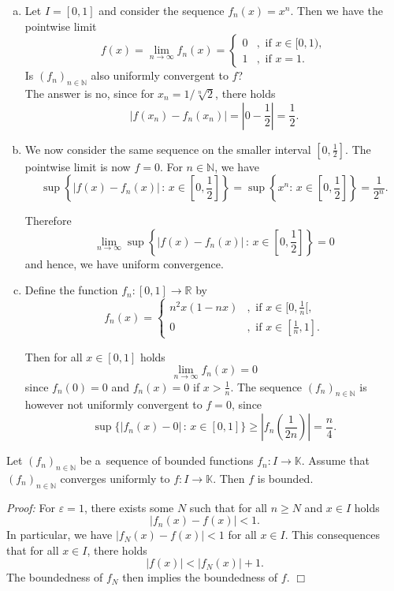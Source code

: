 \begin{example}\label{ex:funcconv}
 \begin{enumerate}[a)]
\item Let $I=[0,1]$ and consider the sequence $f_n(x)= x^n$. Then we have the pointwise limit
\[f(x)=\lim_{n\to\infty}f_n(x)=\begin{cases}0&,\text{ if }x\in[0,1),\\1&,\text{ if }x=1.\end{cases}\]
Is $(f_n)_{n\in\mathbb{N}}$ also uniformly convergent to $f$?\\

The answer is no, since for $x_n=1/\sqrt[n]{2}$, there holds
\[|f(x_n)-f_n(x_n)|=\left|0-{\textstyle\frac12}\right|={\textstyle\frac12}.\]

\item We now consider the same sequence on the smaller interval $[0,\frac12]$. The pointwise limit is now $f=0$. For $n\in\mathbb{N}$, we have
\[\sup\left\{|f(x)-f_n(x)|\,:\,x\in[0,{\textstyle\frac12}]\right\}=\sup\left\{x^{n}:\,x\in[0,{\textstyle\frac12}]\right\}=\frac1{2^n}.\]

Therefore
\[\lim_{n\to\infty}\sup\left\{|f(x)-f_n(x)|\,:\,x\in[0,{\textstyle\frac12}]\right\}=0\]
and hence, we have uniform convergence.

\item Define the function $f_n:[0,1]\to\mathbb{R}$ by
\[f_n(x)=\begin{cases}n^2x(1-nx)&,\text{ if }x\in[0,\frac1n[,\\0&,\text{ if }x\in[\frac1n,1].\end{cases}\]

Then for all $x\in[0,1]$ holds
\[\lim_{n\to\infty}f_n(x)=0\]
since $f_n(0)=0$ and $f_n(x)=0$ if $x>\frac1n$. The sequence $(f_n)_{n\in\mathbb{N}}$ is however not uniformly convergent to $f=0$, since
\[\sup\{|f_n(x)-0|\,:\,x\in[0,1]\}\geq\left|f_n\left({\textstyle\frac1{2n}}\right)\right|=\frac{n}4.\]

\end{enumerate}
\end{example}

\begin{Theorem}{}\label{thm:unifconvbound}
Let $(f_n)_{n\in\mathbb{N}}$ be a~sequence of bounded functions $f_n:I\to\mathbb{K}$. Assume that $(f_n)_{n\in\mathbb{N}}$ converges uniformly to $f:I\to\mathbb{K}$. Then $f$ is bounded.
\end{Theorem}
{\em Proof:} For $\varepsilon=1$, there exists some $N$ such that for all $n\geq N$ and $x\in I$ holds \[|f_n(x)-f(x)|<1.\] In particular, we have $|f_N(x)-f(x)|<1$ for all $x\in I$.
This consequences that for all $x\in  I$, there holds \[|f(x)|<|f_N(x)|+1.\] The boundedness of $f_N$ then implies the boundedness of $f$.
\hfill$\Box$

